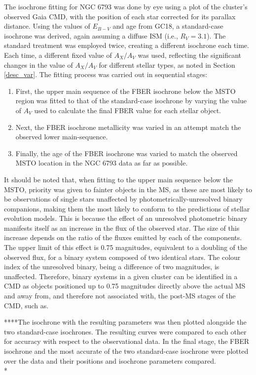 \documentclass[12pt, a4paper]{report}
\begin{document}
The isochrone fitting for NGC 6793 was done by eye using a plot of the cluster's observed Gaia CMD, with the position of each star corrected for its parallax distance. Using the values of $E_{B-V}$ and age from GC18, a standard-case isochrone was derived, again assuming a diffuse ISM (i.e., $R_{V} = 3.1$). The standard treatment was employed twice, creating a different isochrone each time. Each time, a different fixed value of $A_{X}/A_{V}$ was used, reflecting the significant changes in the value of $A_{X}/A_{V}$ for different stellar types, as noted in Section \ref{desc_var}. The fitting process was carried out in sequential stages:

\begin{enumerate}
\item First, the upper main sequence of the FBER isochrone below the MSTO region was fitted to that of the standard-case isochrone by varying the value of $A_{V}$ used to calculate the final FBER value for each stellar object.
\item Next, the FBER isochrone metallicity was varied in an attempt match the observed lower main-sequence.
\item Finally, the age of the FBER isochrone was varied to match the observed MSTO location in the NGC 6793 data as far as possible.

\end{enumerate}

It should be noted that, when fitting  to the upper main sequence below the MSTO, priority was given to fainter objects in the MS, as these are most likely to be observations of single stars unaffected by photometrically-unresolved binary companions, making them the most likely to conform to the predictions of stellar evolution models. This is because the effect of an unresolved photometric binary manifests itself as an increase in the flux of the observed star. The size of this increase depends on the ratio of the fluxes emitted by each of the components. The upper limit of this effect is 0.75 magnitudes, equivalent to a doubling of the observed flux, for a binary system composed of two identical stars. The colour index of the unresolved binary, being a difference of two magnitudes, is unaffected. Therefore, binary systems in a given cluster can be identified in a CMD as objects positioned up to 0.75 magnitudes directly above the actual MS and away from, and therefore not associated with, the post-MS stages of the CMD, such as.


 ****The isochrone with the resulting parameters was then plotted alongside the two standard-case isochrones. The resulting curves were compared to each other for accuracy with respect to the observational data. In the final stage, the FBER isochrone and the most accurate of the two standard-case isochrone were plotted over the data and their positions and isochrone parameters compared.\\*
\end{document}
